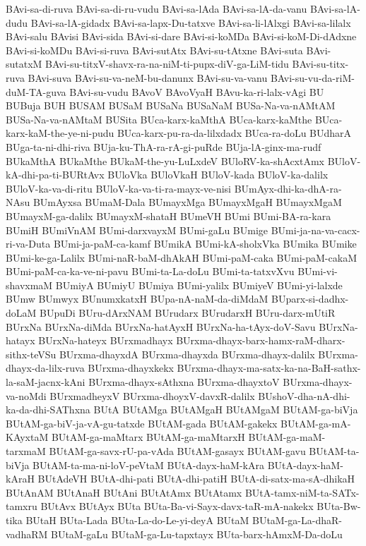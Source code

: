 {BAvi-sa-di-ruva
BAvi-sa-di-ru-vudu
BAvi-sa-lAda
BAvi-sa-lA-da-vanu
BAvi-sa-lA-dudu
BAvi-sa-lA-gidadx
BAvi-sa-lapx-Du-tatxve
BAvi-sa-li-lAlxgi
BAvi-sa-lilalx
BAvi-salu
BAvisi
BAvi-sida
BAvi-si-dare
BAvi-si-koMDa
BAvi-si-koM-Di-dAdxne
BAvi-si-koMDu
BAvi-si-ruva
BAvi-sutAtx
BAvi-su-tAtxne
BAvi-suta
BAvi-sutatxM
BAvi-su-titxV-shavx-ra-na-niM-ti-pupx-diV-ga-LiM-tidu
BAvi-su-titx-ruva
BAvi-suva
BAvi-su-va-neM-bu-danunx
BAvi-su-va-vanu
BAvi-su-vu-da-riM-duM-TA-guva
BAvi-su-vudu
BAvoV
BAvoVyaH
BAvu-ka-ri-lalx-vAgi
BU
BUBuja
BUH
BUSAM
BUSaM
BUSaNa
BUSaNaM
BUSa-Na-va-nAMtAM
BUSa-Na-va-nAMtaM
BUSita
BUca-karx-kaMthA
BUca-karx-kaMthe
BUca-karx-kaM-the-ye-ni-pudu
BUca-karx-pu-ra-da-lilxdadx
BUca-ra-doLu
BUdharA
BUga-ta-ni-dhi-riva
BUja-ku-ThA-ra-rA-gi-puRde
BUja-lA-ginx-ma-rudf
BUkaMthA
BUkaMthe
BUkaM-the-yu-LuLxdeV
BUloRV-ka-shAcxtAmx
BUloV-kA-dhi-pa-ti-BURtAvx
BUloVka
BUloVkaH
BUloV-kada
BUloV-ka-dalilx
BUloV-ka-va-di-ritu
BUloV-ka-va-ti-ra-mayx-ve-nisi
BUmAyx-dhi-ka-dhA-ra-NAsu
BUmAyxsa
BUmaM-Dala
BUmayxMga
BUmayxMgaH
BUmayxMgaM
BUmayxM-ga-dalilx
BUmayxM-shataH
BUmeVH
BUmi
BUmi-BA-ra-kara
BUmiH
BUmiVnAM
BUmi-darxvayxM
BUmi-gaLu
BUmige
BUmi-ja-na-va-cacx-ri-va-Duta
BUmi-ja-paM-ca-kamf
BUmikA
BUmi-kA-sholxVka
BUmika
BUmike
BUmi-ke-ga-Lalilx
BUmi-naR-baM-dhAkAH
BUmi-paM-caka
BUmi-paM-cakaM
BUmi-paM-ca-ka-ve-ni-pavu
BUmi-ta-La-doLu
BUmi-ta-tatxvXvu
BUmi-vi-shavxmaM
BUmiyA
BUmiyU
BUmiya
BUmi-yalilx
BUmiyeV
BUmi-yi-lalxde
BUmw
BUmwyx
BUnumxkatxH
BUpa-nA-naM-da-diMdaM
BUparx-si-dadhx-doLaM
BUpuDi
BUru-dArxNAM
BUrudarx
BUrudarxH
BUru-darx-mUtiR
BUrxNa
BUrxNa-diMda
BUrxNa-hatAyxH
BUrxNa-ha-tAyx-doV-Savu
BUrxNa-hatayx
BUrxNa-hateyx
BUrxmadhayx
BUrxma-dhayx-barx-hamx-raM-dharx-sithx-teVSu
BUrxma-dhayxdA
BUrxma-dhayxda
BUrxma-dhayx-dalilx
BUrxma-dhayx-da-lilx-ruva
BUrxma-dhayxkekx
BUrxma-dhayx-ma-satx-ka-na-BaH-sathx-la-saM-jacnx-kAni
BUrxma-dhayx-sAthxna
BUrxma-dhayxtoV
BUrxma-dhayx-va-noMdi
BUrxmadheyxV
BUrxma-dhoyxV-davxR-dalilx
BUshoV-dha-nA-dhi-ka-da-dhi-SAThxna
BUtA
BUtAMga
BUtAMgaH
BUtAMgaM
BUtAM-ga-biVja
BUtAM-ga-biV-ja-vA-gu-tatxde
BUtAM-gada
BUtAM-gakekx
BUtAM-ga-mA-KAyxtaM
BUtAM-ga-maMtarx
BUtAM-ga-maMtarxH
BUtAM-ga-maM-tarxmaM
BUtAM-ga-savx-rU-pa-vAda
BUtAM-gasayx
BUtAM-gavu
BUtAM-ta-biVja
BUtAM-ta-ma-ni-loV-peVtaM
BUtA-dayx-haM-kAra
BUtA-dayx-haM-kAraH
BUtAdeVH
BUtA-dhi-pati
BUtA-dhi-patiH
BUtA-di-satx-ma-sA-dhikaH
BUtAnAM
BUtAnaH
BUtAni
BUtAtAmx
BUtAtamx
BUtA-tamx-niM-ta-SATx-tamxru
BUtAvx
BUtAyx
BUta
BUta-Ba-vi-Sayx-davx-taR-mA-nakekx
BUta-Bw-tika
BUtaH
BUta-Lada
BUta-La-do-Le-yi-deyA
BUtaM
BUtaM-ga-La-dhaR-vadhaRM
BUtaM-gaLu
BUtaM-ga-Lu-tapxtayx
BUta-barx-hAmxM-Da-doLu
}
